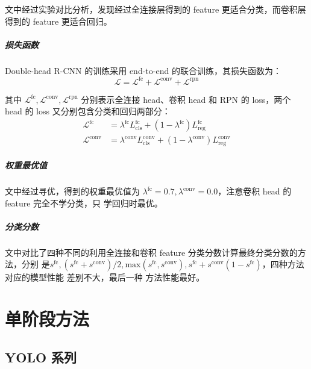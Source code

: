 文中经过实验对比分析，发现经过全连接层得到的 feature 更适合分类，而卷积层得到的
feature 更适合回归。

\paragraph{损失函数}
Double-head R-CNN 的训练采用 end-to-end 的联合训练，其损失函数为：
\begin{equation}
  \label{equ:double-head-loss}
  \mathcal{L} = \mathcal{L}^{\mathrm{fc}} + \mathcal{L}^{\mathrm{conv}} + \mathcal{L}^{\mathrm{rpn}}
\end{equation}

其中 $\mathcal{L}^{\mathrm{fc}}, \mathcal{L}^{\mathrm{conv}},
\mathcal{L}^{\mathrm{rpn}}$ 分别表示全连接 head、卷积 head 和 RPN 的 loss，两个
head 的 loss 又分别包含分类和回归两部分：
\begin{align}
  \label{equ:double-head-fc-loss}
  \mathcal{L}^{\mathrm{fc}} & = \lambda^{\mathrm{fc}}L_{\mathrm{cls}}^{\mathrm{fc}} + (1-\lambda^{\mathrm{fc}})L_{\mathrm{reg}}^{\mathrm{fc}} \\
  \label{equ:double-head-conv-loss}
  \mathcal{L}^{\mathrm{conv}} & = \lambda^{\mathrm{conv}}L_{\mathrm{cls}}^{\mathrm{conv}} + (1-\lambda^{\mathrm{conv}})L_{\mathrm{reg}}^{\mathrm{conv}}
\end{align}

\paragraph{权重最优值}
文中经过寻优，得到的权重最优值为 $\lambda^{\mathrm{fc}} = 0.7,
\lambda^{\mathrm{\mathrm{conv}}} = 0.0$，注意卷积 head 的 feature 完全不学分类，只
学回归时最优。

\paragraph{分类分数}
文中对比了四种不同的利用全连接和卷积 feature 分类分数计算最终分类分数的方法，分别
是$s^{\mathrm{fc}}, (s^{\mathrm{fc}} + s^{\mathrm{conv}})/2,
\mathrm{max}(s^{\mathrm{fc}}, s^{\mathrm{conv}}), s^{\mathrm{fc}} +
s^{\mathrm{conv}}(1-s^{\mathrm{fc}})$，四种方法对应的模型性能 差别不大，最后一种
方法性能最好。

\chapter{单阶段方法}

\section{YOLO 系列}
\label{sec:YOLO}

